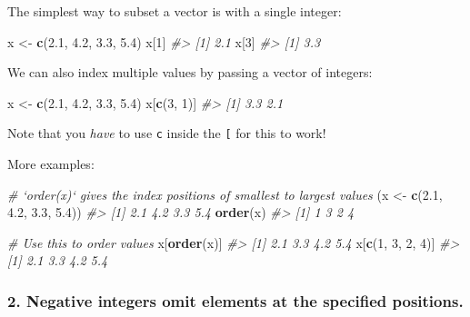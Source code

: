 \documentclass[
]{book}
\newenvironment{Shaded}{\begin{snugshade}}{\end{snugshade}}
\newcommand{\CommentTok}[1]{\textcolor[rgb]{0.56,0.35,0.01}{\textit{#1}}}
\newcommand{\DecValTok}[1]{\textcolor[rgb]{0.00,0.00,0.81}{#1}}
\newcommand{\FloatTok}[1]{\textcolor[rgb]{0.00,0.00,0.81}{#1}}
\newcommand{\KeywordTok}[1]{\textcolor[rgb]{0.13,0.29,0.53}{\textbf{#1}}}
\newcommand{\NormalTok}[1]{#1}
\newcommand{\StringTok}[1]{\textcolor[rgb]{0.31,0.60,0.02}{#1}}
\begin{document}
The simplest way to subset a vector is with a single integer:

\begin{Shaded}
\begin{Highlighting}[]
\NormalTok{x <-}\StringTok{ }\KeywordTok{c}\NormalTok{(}\FloatTok{2.1}\NormalTok{, }\FloatTok{4.2}\NormalTok{, }\FloatTok{3.3}\NormalTok{, }\FloatTok{5.4}\NormalTok{)}
\NormalTok{x[}\DecValTok{1}\NormalTok{]}
\CommentTok{#> [1] 2.1}
\NormalTok{x[}\DecValTok{3}\NormalTok{]}
\CommentTok{#> [1] 3.3}
\end{Highlighting}
\end{Shaded}

We can also index multiple values by passing a vector of integers:

\begin{Shaded}
\begin{Highlighting}[]
\NormalTok{x <-}\StringTok{ }\KeywordTok{c}\NormalTok{(}\FloatTok{2.1}\NormalTok{, }\FloatTok{4.2}\NormalTok{, }\FloatTok{3.3}\NormalTok{, }\FloatTok{5.4}\NormalTok{)}
\NormalTok{x[}\KeywordTok{c}\NormalTok{(}\DecValTok{3}\NormalTok{, }\DecValTok{1}\NormalTok{)]}
\CommentTok{#> [1] 3.3 2.1}
\end{Highlighting}
\end{Shaded}

Note that you \emph{have} to use \texttt{c} inside the \texttt{{[}} for this to work!

More examples:

\begin{Shaded}
\begin{Highlighting}[]
\CommentTok{# `order(x)` gives the index positions of smallest to largest values}
\NormalTok{(x <-}\StringTok{ }\KeywordTok{c}\NormalTok{(}\FloatTok{2.1}\NormalTok{, }\FloatTok{4.2}\NormalTok{, }\FloatTok{3.3}\NormalTok{, }\FloatTok{5.4}\NormalTok{))}
\CommentTok{#> [1] 2.1 4.2 3.3 5.4}
\KeywordTok{order}\NormalTok{(x)}
\CommentTok{#> [1] 1 3 2 4}

\CommentTok{# Use this to order values}
\NormalTok{x[}\KeywordTok{order}\NormalTok{(x)]}
\CommentTok{#> [1] 2.1 3.3 4.2 5.4}
\NormalTok{x[}\KeywordTok{c}\NormalTok{(}\DecValTok{1}\NormalTok{, }\DecValTok{3}\NormalTok{, }\DecValTok{2}\NormalTok{, }\DecValTok{4}\NormalTok{)]}
\CommentTok{#> [1] 2.1 3.3 4.2 5.4}
\end{Highlighting}
\end{Shaded}

\hypertarget{negative-integers-omit-elements-at-the-specified-positions.}{%
\subsubsection*{\texorpdfstring{2. \textbf{Negative integers} omit elements at the specified positions.}{2. Negative integers omit elements at the specified positions.}}\label{negative-integers-omit-elements-at-the-specified-positions.}}
\end{document}
